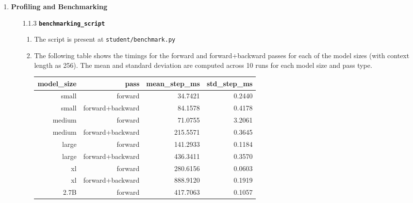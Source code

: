 \documentclass{article}
\begin{document}
\begin{enumerate}[start=1,label=\arabic*.]
    \item \textbf{Profiling and Benchmarking}
    \begin{enumerate}
        \item[1.1.3] \textbf{\texttt{benchmarking\_script}}
            \begin{enumerate}[label=\alph*.]
                \item The script is present at \texttt{student/benchmark.py}
                \item The following table shows the timings for the forward and forward+backward passes for each of the model sizes (with context length as 256). The mean and standard deviation are computed across 10 runs for each model size and pass type.
                    \begin{table}[h]
                        \centering
                            \begin{tabular}{|r|r|r|r|}
                                \hline
                                model\_size & pass & mean\_step\_ms & std\_step\_ms \\
                                \hline
                                small & forward & 34.7421 & 0.2440 \\
                                \hline
                                small & forward+backward & 84.1578 & 0.4178 \\
                                \hline
                                medium & forward & 71.0755 & 3.2061  \\
                                \hline
                                medium & forward+backward & 215.5571 & 0.3645  \\
                                \hline
                                large & forward & 141.2933 & 0.1184 \\
                                \hline
                                large & forward+backward & 436.3411 & 0.3570  \\
                                \hline
                                xl & forward & 280.6156 & 0.0603 \\
                                \hline
                                xl & forward+backward & 888.9120 & 0.1919  \\
                                \hline
                                2.7B & forward & 417.7063 & 0.1057 \\
                                \hline

\end{tabular}
\end{table}
\end{enumerate}
\end{enumerate}
\end{enumerate}
\end{document}
